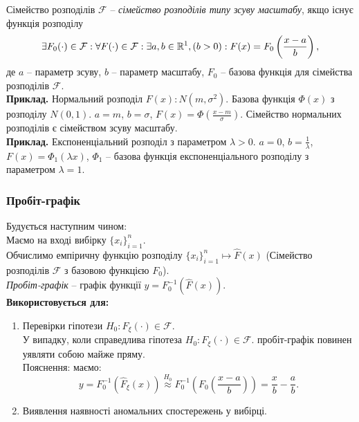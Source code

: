 Сімейство розподілів $\mathcal{F}$ -- \textit{сімейство розподілів типу зсуву масштабу}, якщо існує функція розподілу \[ \exists F_0(\cdot) \in \mathcal{F}: \forall F(\cdot) \in \mathcal{F}: \exists a, b \in \mathbb{R}^1, (b > 0): F(x) = F_0\left(\dfrac{x-a}{b}\right), \]
де $a$ -- параметр зсуву, $b$ -- параметр масштабу, $F_0$ -- базова функція для сімейства розподілів $\mathcal{F}$. \\

\textbf{Приклад.} Нормальний розподіл $F(x): N(m, \sigma^2)$. Базова функція $\Phi(x)$ з розподілу $N(0,1)$. $a = m$, $b = \sigma$, $F(x) = \Phi\left(\frac{x - m}{\sigma}\right)$. Сімейство нормальних розподілів є сімейством зсуву масштабу. \\

\textbf{Приклад.} Експоненціальний розподіл з параметром $\lambda > 0$. $a = 0$, $b = \frac{1}{\lambda}$, $F(x) = \Phi_1(\lambda x)$, $\Phi_1$ -- базова функція експоненціального розподілу з параметром $\lambda = 1$. \\
 
\subsubsection{Пробіт-графік}

Будується наступним чином: \\

Маємо на вході вибірку $\{x_i\}_{i=1}^n$. \\

Обчислимо емпіричну функцію розподілу $\{x_i\}_{i=1}^n \mapsto \widehat{F}(x)$ (Сімейство розподілів $\mathcal{F}$ з базовою функцією $F_0$). \\

\textit{Пробіт-графік} -- графік функції $y = F_0^{-1}\left(\widehat{F}(x)\right)$. \\

\textbf{Використовується для:}
\begin{enumerate}
	\item Перевірки гіпотези $H_0: F_\xi(\cdot) \in \mathcal{F}$. \\

	У випадку, коли справедлива гіпотеза $H_0: F_\xi(\cdot) \in \mathcal{F}$. пробіт-графік повинен уявляти собою майже пряму. \\


	Пояснення: маємо: \[ y = F_0^{-1}(\widehat{F}_\xi(x)) \overset{H_0}{\approx} F_0^{-1}\left(F_0\left(\dfrac{x-a}{b}\right)\right) = \dfrac{x}{b} - \dfrac{a}{b}. \]

	\item Виявлення наявності аномальних спостережень у вибірці.

\end{enumerate}